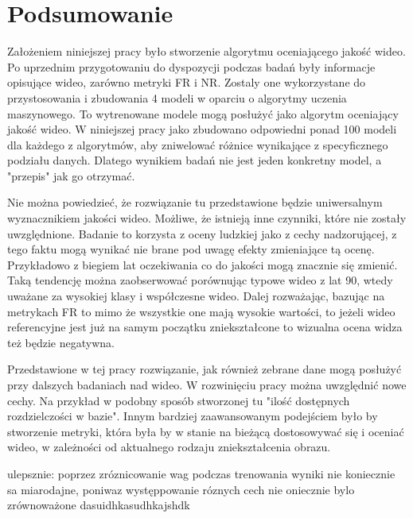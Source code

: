\chapter{Podsumowanie}


Założeniem niniejszej pracy było stworzenie algorytmu oceniającego jakość wideo. Po uprzednim przygotowaniu do dyspozycji podczas badań były  informacje opisujące wideo, zarówno metryki FR i NR. Zostaly one wykorzystane do przystosowania i zbudowania 4 modeli w oparciu o algorytmy uczenia maszynowego. 
To wytrenowane modele mogą posłużyć jako algorytm oceniający jakość wideo. W niniejszej pracy jako zbudowano odpowiedni ponad 100 modeli dla każdego z algorytmów, aby zniwelować  różnice wynikające z specyficznego podziału danych. Dlatego wynikiem badań nie jest  jeden konkretny model, a "przepis" jak go otrzymać.\par

Nie można powiedzieć, że rozwiązanie tu przedstawione będzie uniwersalnym wyznacznikiem jakości wideo. Możliwe, że istnieją inne czynniki, które nie zostały uwzględnione. Badanie to korzysta z oceny ludzkiej jako z cechy nadzorującej, z tego faktu mogą wynikać nie brane pod uwagę efekty zmieniające tą ocenę. Przykładowo z biegiem lat oczekiwania co do jakości mogą znacznie się zmienić. Taką tendencję można zaobserwować porównując typowe wideo z lat 90, wtedy uważane za wysokiej klasy i współczesne wideo. Dalej rozważając,  bazując na metrykach FR to mimo że wszystkie one mają wysokie wartości, to jeżeli wideo referencyjne jest już na samym początku zniekształcone to wizualna ocena widza też będzie negatywna. \par

Przedstawione w tej pracy rozwiązanie, jak również zebrane dane mogą posłużyć przy dalszych badaniach nad wideo. W rozwinięciu pracy  można uwzględnić nowe cechy. Na przykład w podobny sposób stworzonej tu "ilość dostępnych rozdzielczości w bazie". Innym bardziej zaawansowanym podejściem było by stworzenie metryki, która była by  w stanie na bieżącą dostosowywać się i oceniać wideo, w zależności od aktualnego rodzaju zniekształcenia obrazu.\par



ulepsznie: poprzez zróznicowanie wag podczas trenowania
wyniki nie koniecznie sa miarodajne, poniwaz występpowanie róznych cech nie oniecznie bylo zrównoważone
dasuidhkasudhkajshdk
\label{cha:pierwszyDokument}









